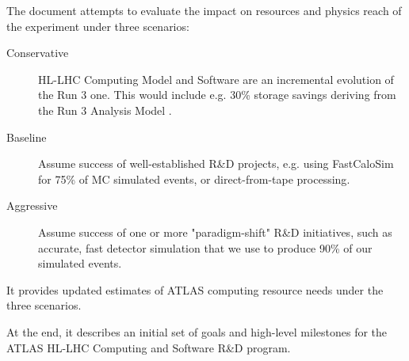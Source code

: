 The document attempts to evaluate the impact on resources and physics reach of the experiment under three scenarios:
\begin{description}
  \item[Conservative] HL-LHC Computing Model and Software are an incremental evolution of the Run 3 one. This would include e.g. 30\% storage savings deriving from the Run 3 Analysis Model \cite{ref:AMSG3}.
  \item[Baseline] Assume success of well-established R\&D projects, e.g. using FastCaloSim \cite{ref:FastChain} for 75\% of MC simulated events, or direct-from-tape processing\cite{ref:DataCarousel}.
  \item[Aggressive] Assume success of one or more "paradigm-shift" R\&D initiatives, such as accurate, fast detector simulation\cite{ref:CaloGAN} that we use to produce 90\% of our simulated events.
\end{description}
 It provides updated estimates of ATLAS computing resource needs under the three scenarios. 

At the end, it describes an initial set of goals and high-level milestones for the ATLAS HL-LHC Computing and Software R\&D program.